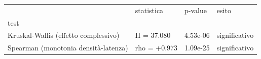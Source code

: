 \begin{tabular}{llll}
\toprule
 & statistica & p-value & esito \\
test &  &  &  \\
\midrule
Kruskal-Wallis (effetto complessivo) & H = 37.080 & 4.53e-06 & significativo \\
Spearman (monotonia densità-latenza) & rho = +0.973 & 1.09e-25 & significativo \\
\bottomrule
\end{tabular}
